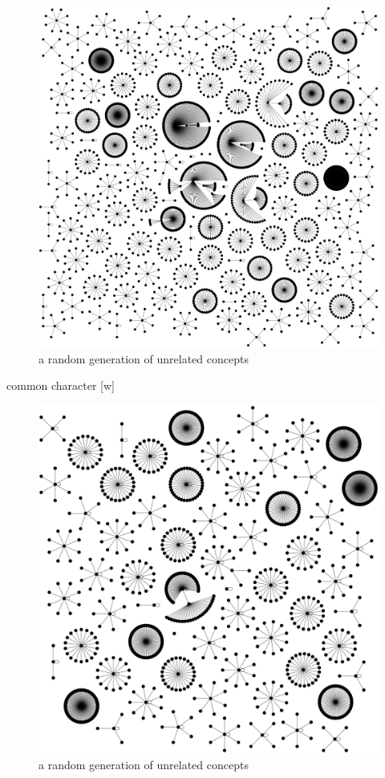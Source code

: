 \documentclass[11pt]{article}
\begin{document}
\begin{figure}[htp]
\includegraphics[scale=0.10]{img/m_directories.png}
\caption{a random generation of unrelated concepts}
\label{}
\end{figure}




common character [w]

\begin{figure}[htp]
\includegraphics[scale=0.10]{img/w_directories.png}
\caption{a random generation of unrelated concepts}
\label{}
\end{figure}
\end{document}
